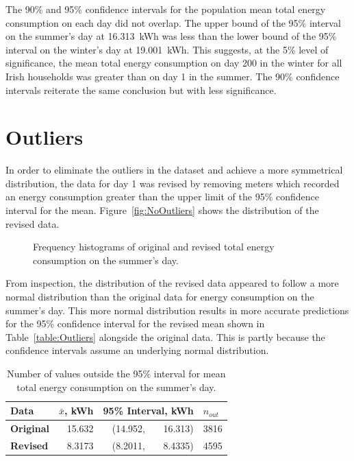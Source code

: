 \documentclass[a4paper,10pt,twocolumn]{article}
\begin{document}
The 90\% and 95\% confidence intervals for the population mean total energy 
consumption on each day did not overlap. The upper bound of the 95\% interval 
on the summer's day at 16.313~kWh was less than the lower bound of the 95\% 
interval on the winter's day at 19.001~kWh. This suggests, at the 5\% level of 
significance, the mean total energy consumption on day 200 in the winter for 
all Irish households was greater than on day 1 in the summer. The 90\% 
confidence intervals reiterate the same conclusion but with less significance.

\section{Outliers}

In order to eliminate the outliers in the dataset and achieve a more 
symmetrical distribution, the data for day 1 was revised by removing meters 
which recorded an energy consumption greater than the upper limit of the 95\% 
confidence interval for the mean. Figure~\vref{fig:NoOutliers} shows the 
distribution of the revised data.

\begin{figure}[h]
    \centering
    \def\svgwidth{0.5\textwidth}
    
    \caption{Frequency histograms of original and revised total energy 
    consumption on the summer's day.}
    \label{fig:NoOutliers}
\end{figure}

From inspection, the distribution of the revised data appeared to follow a more 
normal distribution than the original data for energy consumption on the 
summer's day. This more normal distribution results in more accurate 
predictions for the 95\% confidence interval for the revised mean shown in 
Table~\vref{table:Outliers} alongside the original data. This is partly because 
the confidence intervals assume an underlying normal distribution.

\begin{table}[h]
    \centering
    \caption{Number of values outside the 95\% interval for mean total energy 
        consumption on the summer's day.\vspace{-\parsep}}
    \label{table:Outliers}
    \begin{tabular}{lrr@{\,}rr}
        \toprule
        \textbf{Data} & 
        \multicolumn{1}{l}{$\bar{x}$, \tiny{kWh}} & 
        \multicolumn{2}{l}{95\% Interval, \tiny{kWh}} & 
        \multicolumn{1}{l}{$n_{out}$} \\
        \midrule
        \textbf{Original} & 15.632 & (14.952, & 16.313) & 3816 \\
        \textbf{Revised}  & 8.3173 & (8.2011, & 8.4335) & 4595 \\
        \bottomrule
    \end{tabular}
\end{table}
\end{document}
